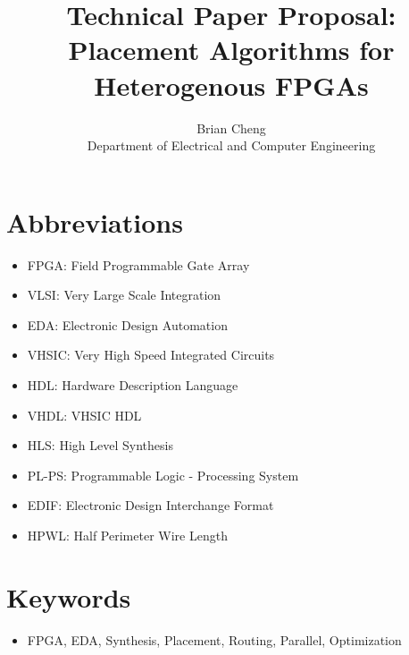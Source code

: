\documentclass{article}
\begin{document}
\title{Technical Paper Proposal: \\ Placement Algorithms for Heterogenous FPGAs}
\author{Brian Cheng \\ Department of Electrical and Computer Engineering}


\date{}
\maketitle

\section{Abbreviations}
\begin{itemize}[label={--}, left=0.25cm] %
    \item FPGA: Field Programmable Gate Array
    \item VLSI: Very Large Scale Integration
    \item EDA: Electronic Design Automation
    \item VHSIC: Very High Speed Integrated Circuits
    \item HDL: Hardware Description Language
    \item VHDL: VHSIC HDL
    \item HLS: High Level Synthesis
    \item PL-PS: Programmable Logic - Processing System
    \item EDIF: Electronic Design Interchange Format
    \item HPWL: Half Perimeter Wire Length
\end{itemize}

\section{Keywords}
\begin{itemize}
    \item FPGA, EDA, Synthesis, Placement, Routing, Parallel, Optimization
\end{itemize}
\end{document}
